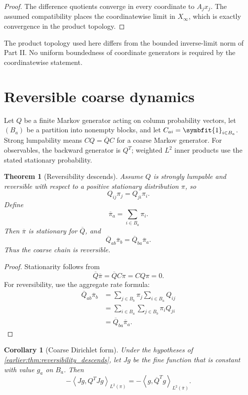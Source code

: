 \documentclass[11pt,letterpaper]{article}
\newtheorem{theorem}{Theorem}[section]
\theoremstyle{plain}
\theoremstyle{plain}
\theoremstyle{plain}
\newtheorem{corollary}[corollary]{Corollary}
\theoremstyle{definition}
\theoremstyle{definition}
\theoremstyle{definition}
\theoremstyle{definition}
\theoremstyle{definition}
\theoremstyle{remark}
\theoremstyle{remark}
\theoremstyle{remark}
\theoremstyle{remark}
\theoremstyle{remark}
\theoremstyle{remark}
\newcommand{\one}{\bm 1}
\newcommand{\ip}[2]{\left\langle#1,#2\right\rangle}
\providecommand{\bm}[1]{\symbfit{#1}}
\begin{document}
\begin{proof}
The difference quotients converge in every coordinate to \(A_jx_j\). The assumed compatibility places the coordinatewise limit in \(X_\infty\), which is exactly convergence in the product topology.
\end{proof}


The product topology used here differs from the bounded inverse-limit norm of Part II. No uniform boundedness of coordinate generators is required by the coordinatewise statement.
\FloatBarrier
\section{Reversible coarse dynamics}\label{earlier:section:02}
Let $Q$ be a finite Markov generator acting on column probability vectors, let $(B_a)$ be a partition into nonempty blocks, and let $C_{ai}=\one_{i\in B_a}$. Strong lumpability means $CQ=\overline Q C$ for a coarse Markov generator. For observables, the backward generator is $Q^T$; weighted $L^2$ inner products use the stated stationary probability.
\begin{theorem}[Reversibility descends]\label{earlier:record:009}\label{earlier:thm:reversibility_descends}
Assume \(Q\) is strongly lumpable and reversible with respect to a positive stationary distribution \(\pi\), so
\[
Q_{ij}\pi_j=Q_{ji}\pi_i.
\]
Define
\[
\overline\pi_a=\sum_{i\in B_a}\pi_i.
\]
Then \(\overline\pi\) is stationary for \(\overline Q\), and
\[
\overline Q_{ab}\overline\pi_b
=
\overline Q_{ba}\overline\pi_a.
\]
Thus the coarse chain is reversible.
\end{theorem}

\begin{proof}
Stationarity follows from
\[
\overline Q\overline\pi
=\overline QC\pi
=CQ\pi=0.
\]
For reversibility, use the aggregate rate formula:
\[
\begin{aligned}
\overline Q_{ab}\overline\pi_b
&=\sum_{j\in B_b}\pi_j\sum_{i\in B_a}Q_{ij}\\
&=\sum_{i\in B_a}\sum_{j\in B_b}\pi_iQ_{ji}\\
&=\overline Q_{ba}\overline\pi_a.
\end{aligned}
\]
\end{proof}

\begin{corollary}[Coarse Dirichlet form]\label{earlier:record:010}\label{earlier:cor:coarse_dirichlet_form}
Under the hypotheses of \cref{earlier:thm:reversibility_descends}, let \(Jg\) be the fine function that is constant with value \(g_a\) on \(B_a\). Then
\[
-\ip{Jg}{Q^TJg}_{L^2(\pi)}
=
-\ip{g}{\overline Q^Tg}_{L^2(\overline\pi)}.
\]
\end{corollary}
\end{document}
